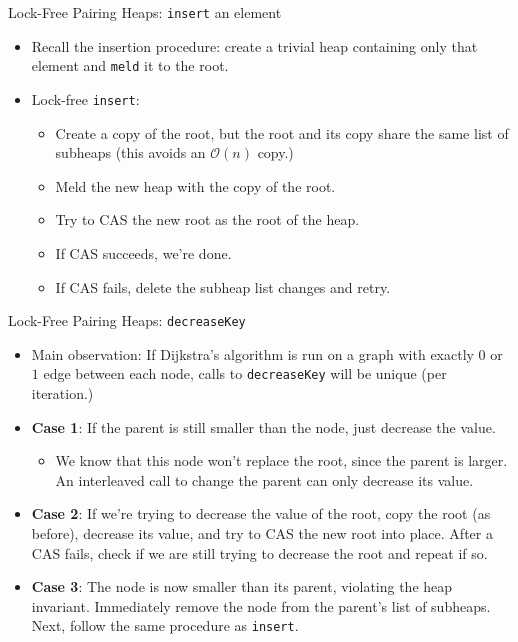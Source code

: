 \documentclass{beamer}
\begin{document}
\begin{frame}{Lock-Free Pairing Heaps: \texttt{insert} an element}
  \begin{itemize}
    \item Recall the insertion procedure: create a trivial heap containing only that
      element and \texttt{meld} it to the root.
    \item Lock-free \texttt{insert}:
      \begin{itemize}
        \item Create a copy of the root, but the root and its copy share the same
          list of subheaps (this avoids an $\mathcal{O}(n)$ copy.)
        \item Meld the new heap with the copy of the root.
        \item Try to CAS the new root as the root of the heap.
        \item If CAS succeeds, we're done.
        \item If CAS fails, delete the subheap list changes and retry.
      \end{itemize}
    \end{itemize}
\end{frame}

\begin{frame}{Lock-Free Pairing Heaps: \texttt{decreaseKey}}
  \begin{itemize}
    \item Main observation: If Dijkstra's algorithm is run on a graph with
      exactly $0$ or $1$ edge between each node, calls to \texttt{decreaseKey}
      will be unique (per iteration.)
    \item \textbf{Case 1}: If the parent is still smaller than the node, just decrease the value.
      \begin{itemize}
        \item We know that this node won't replace the root, since the parent is larger.
          An interleaved call to change the parent can only decrease its value.
      \end{itemize}
    \item \textbf{Case 2}: If we're trying to decrease the value of the root, copy the root (as before),
      decrease its value, and try to CAS the new root into place. After a CAS fails, check if
      we are still trying to decrease the root and repeat if so.
    \item \textbf{Case 3}: The node is now smaller than its parent, violating the heap invariant. Immediately remove
      the node from the parent's list of subheaps. Next, follow the same procedure as \texttt{insert}.
  \end{itemize}
\end{frame}
\end{document}
